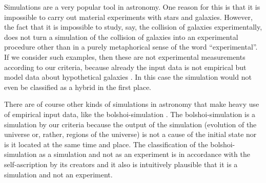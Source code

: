 \documentclass[12pt, a4paper]{article}
\numberwithin{equation}{section}
\begin{document}
Simulations are a very popular tool in astronomy. One reason for this is that it is impossible to carry out material experiments with stars and galaxies. However, the fact that it is impossible to study, say, the collision of galaxies experimentally, does not turn a simulation of the collision of galaxies into an experimental procedure other than in a purely metaphorical sense of the word ``experimental''. If we consider such examples, then these are not experimental measurements according to our criteria, because already the input data is not empirical but model data about hypothetical galaxies \citep{struck:1997}. In this case the simulation would not even be classified as a hybrid in the first place. 

There are of course other kinds of simulations in astronomy that make heavy use of empirical input data, like the bolshoi-simulation \citep{bolshoi:2011}. The bolshoi-simulation is a simulation by our criteria because the output of the simulation (evolution of the universe or, rather, regions of the universe) is not a cause of the initial state nor is it located at the same time and place. The classification of the bolshoi-simulation as a simulation and not as an experiment is in accordance with the self-ascription by its creators and it also is intuitively plausible that it is a simulation and not an experiment. 

\end{document}
